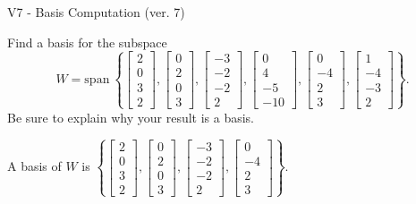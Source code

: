 \begin{exercise}
  \begin{exerciseTitle}V7 - Basis Computation (ver. 7)\end{exerciseTitle}
  \begin{exerciseStatement}
    Find a basis for the subspace 
\[W=\mathrm{span}\ \left\{\left[\begin{array}{r}
2 \\
0 \\
3 \\
2
\end{array}\right] , \left[\begin{array}{r}
0 \\
2 \\
0 \\
3
\end{array}\right] , \left[\begin{array}{r}
-3 \\
-2 \\
-2 \\
2
\end{array}\right] , \left[\begin{array}{r}
0 \\
4 \\
-5 \\
-10
\end{array}\right] , \left[\begin{array}{r}
0 \\
-4 \\
2 \\
3
\end{array}\right] , \left[\begin{array}{r}
1 \\
-4 \\
-3 \\
2
\end{array}\right]\right\}.\]
 Be sure to explain why your result is a basis.


  \end{exerciseStatement}
  \begin{exerciseAnswer}
   A basis of \(W\) is  \(\left\{\left[\begin{array}{r}
2 \\
0 \\
3 \\
2
\end{array}\right] , \left[\begin{array}{r}
0 \\
2 \\
0 \\
3
\end{array}\right] , \left[\begin{array}{r}
-3 \\
-2 \\
-2 \\
2
\end{array}\right] , \left[\begin{array}{r}
0 \\
-4 \\
2 \\
3
\end{array}\right]\right\}\).
  


  \end{exerciseAnswer}
\end{exercise}